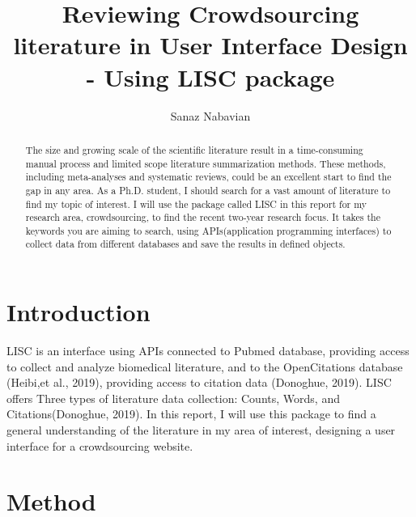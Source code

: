 \documentclass{article}
\title {Reviewing Crowdsourcing literature in User Interface Design - Using LISC package }
\author{Sanaz Nabavian}
\begin{document}
\maketitle

\begin{abstract} %
The size and growing scale of the scientific literature result in a time-consuming manual process and limited scope literature summarization methods. These methods, including meta-analyses and systematic reviews, could be an excellent start to find the gap in any area. As a Ph.D. student, I should search for a vast amount of literature to find my topic of interest. I will use the package called LISC in this report for my research area, crowdsourcing, to find the recent two-year research focus. It takes the keywords you are aiming to search, using APIs(application programming interfaces) to collect data from different databases and save the results in defined objects.
\end{abstract}


\section{Introduction}
LISC is an interface using APIs  connected to Pubmed database, providing access to collect and analyze biomedical literature, and to the OpenCitations database (Heibi,et al., 2019), providing access to citation data (Donoghue, 2019). LISC offers Three types of literature data collection: Counts, Words, and Citations(Donoghue, 2019). In this report, I will use this package to find a general understanding of the literature in my area of interest, designing a user interface for a crowdsourcing website.

\section{Method}
\end{document}
